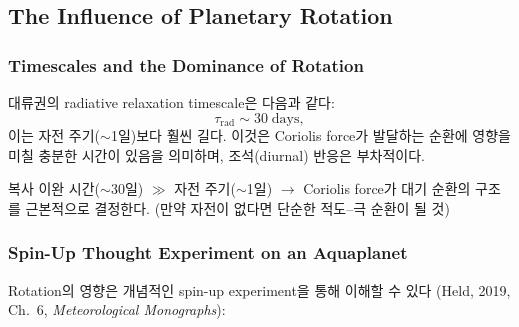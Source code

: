 \subsection{The Influence of Planetary Rotation}\label{subsec:rotation}

\subsubsection{Timescales and the Dominance of Rotation}

대류권의 radiative relaxation timescale은 다음과 같다:
\begin{equation}\label{eq:tau-rad}
  \tau_{\mathrm{rad}} \sim 30 \;\text{days},
\end{equation}
이는 자전 주기($\sim$1일)보다 훨씬 길다.  이것은 Coriolis force가 발달하는 순환에
영향을 미칠 충분한 시간이 있음을 의미하며, 조석(diurnal) 반응은 부차적이다.

\begin{hisublock}
  복사 이완 시간($\sim$30일) $\gg$ 자전 주기($\sim$1일)
  $\to$ Coriolis force가 대기 순환의 구조를 근본적으로 결정한다.
  (만약 자전이 없다면 단순한 적도--극 순환이 될 것)
\end{hisublock}

\subsubsection{Spin-Up Thought Experiment on an Aquaplanet}

Rotation의 영향은 개념적인 spin-up experiment을 통해 이해할 수 있다
(Held, 2019, Ch.~6, \textit{Meteorological Monographs}):

